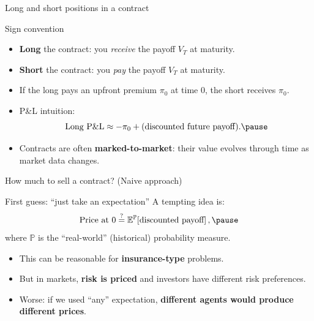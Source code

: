 \documentclass[10pt,aspectratio=169]{beamer}
\begin{document}
\begin{frame}{Long and short positions in a contract}
\begin{block}{Sign convention}
\begin{itemize}
  \item \textbf{Long} the contract: you \emph{receive} the payoff $V_T$ at maturity.\pause
  \item \textbf{Short} the contract: you \emph{pay} the payoff $V_T$ at maturity.\pause
\end{itemize}
\end{block}

\medskip
\begin{itemize}
  \item If the long pays an upfront premium $\pi_0$ at time 0, the short receives $\pi_0$.\pause
  \item P\&L intuition:
  \[
  \text{Long P\&L} \approx -\pi_0 + \text{(discounted future payoff)}.\pause
  \]
  \item Contracts are often \textbf{marked-to-market}: their value evolves through time as market data changes.
\end{itemize}
\end{frame}

\begin{frame}{How much to sell a contract? (Naive approach)}
\begin{block}{First guess: ``just take an expectation''}
A tempting idea is:
\[
\text{Price at }0 \stackrel{?}{=} \mathbb{E}^{\mathbb{P}}\!\left[\text{discounted payoff}\right],\pause
\]
where $\mathbb{P}$ is the ``real-world'' (historical) probability measure.
\end{block}

\medskip
\begin{itemize}
  \item This can be reasonable for \textbf{insurance-type} problems.\pause
  \item But in markets, \textbf{risk is priced} and investors have different risk preferences.\pause
  \item Worse: if we used ``any'' expectation, \textbf{different agents would produce different prices}.
\end{itemize}
\end{frame}
\end{document}
